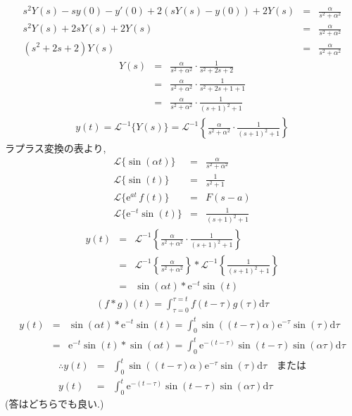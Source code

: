 ﻿\documentclass[a4j]{jarticle}
\begin{document}
\begin{eqnarray*}
s^2Y(s) - sy(0) - y'(0) + 2(sY(s) - y(0)) + 2Y(s) &=& \frac{\alpha}{s^2+\alpha^2} \\
                         s^2Y(s) + 2sY(s) + 2Y(s) &=& \frac{\alpha}{s^2+\alpha^2} \\
                                   (s^2+2s+2)Y(s) &=& \frac{\alpha}{s^2+\alpha^2}
\end{eqnarray*}
\begin{eqnarray*}
Y(s) &=& \frac{\alpha}{s^2+\alpha^2} \cdot \frac{1}{s^2+2s+2} \\
     &=& \frac{\alpha}{s^2+\alpha^2} \cdot \frac{1}{s^2+2s+1 +1} \\
     &=& \frac{\alpha}{s^2+\alpha^2} \cdot \frac{1}{(s+1)^2 +1}
\end{eqnarray*}
\begin{eqnarray*}
y(t) = \mathcal{L}^{-1}\{ Y(s) \} = \mathcal{L}^{-1}\left\{ \frac{\alpha}{s^2+\alpha^2} \cdot \frac{1}{(s+1)^2 +1} \right\}
\end{eqnarray*}
ラプラス変換の表より,
\begin{eqnarray*}
       \mathcal{L} \{ \sin(\alpha t) \} &=& \frac{\alpha}{s^2 + \alpha^2} \\
              \mathcal{L} \{ \sin(t) \} &=& \frac{1}{s^2 + 1} \\
\mathcal{L} \{ \mathrm{e}^{at}\,f(t) \} &=& F(s-a) \\
              \mathcal{L} \{ \mathrm{e}^{-t}\sin(t) \} &=& \frac{1}{(s+1)^2 + 1}
\end{eqnarray*}
\begin{eqnarray*}
y(t) &=& \mathcal{L}^{-1}\left\{ \frac{\alpha}{s^2+\alpha^2} \cdot \frac{1}{(s+1)^2 +1} \right\} \\
     &=& \mathcal{L}^{-1}\left\{ \frac{\alpha}{s^2+\alpha^2} \right\} * \mathcal{L}^{-1}\left\{ \frac{1}{(s+1)^2 +1} \right\} \\
     &=& \sin(\alpha t) * \mathrm{e}^{-t}\sin(t)
\end{eqnarray*}
\begin{eqnarray*}
(f * g)(t) = \int_{\tau=0}^{\tau=t}{f(t-\tau)g(\tau)\mathrm{d}\tau}
\end{eqnarray*}
\begin{eqnarray*}
y(t) &=& \sin(\alpha t) * \mathrm{e}^{-t}\sin(t) = \int_0^t{\sin((t-\tau)\alpha)\mathrm{e}^{-\tau}\sin(\tau)\mathrm{d}\tau } \\
     &=& \mathrm{e}^{-t}\sin(t) * \sin(\alpha t) = \int_0^t{\mathrm{e}^{-(t-\tau)}\sin(t-\tau)\sin(\alpha\tau)\mathrm{d}\tau }
\end{eqnarray*}
\begin{eqnarray*}
\therefore y(t) &=& \int_0^t{\sin((t-\tau)\alpha)\mathrm{e}^{-\tau}\sin(\tau)\mathrm{d}\tau } \quad \text{または} \\
           y(t) &=& \int_0^t{\mathrm{e}^{-(t-\tau)}\sin(t-\tau)\sin(\alpha\tau)\mathrm{d}\tau }
\end{eqnarray*}
(答はどちらでも良い.)
\end{document}
